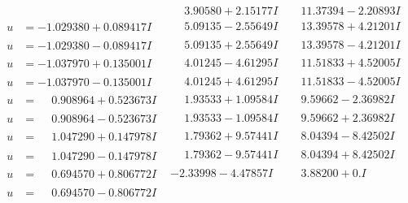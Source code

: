 \documentclass[1p]{elsarticle_modified}
\theoremstyle{definition}
\begin{document}
$$\begin{array}{c|c|c}
 & \phantom{-}3.90580 + 2.15177 I & \phantom{-}11.37394 - 2.20893 I \\ \hline\begin{aligned}
u &= -1.029380 + 0.089417 I\end{aligned}
 & \phantom{-}5.09135 - 2.55649 I & \phantom{-}13.39578 + 4.21201 I \\ \hline\begin{aligned}
u &= -1.029380 - 0.089417 I\end{aligned}
 & \phantom{-}5.09135 + 2.55649 I & \phantom{-}13.39578 - 4.21201 I \\ \hline\begin{aligned}
u &= -1.037970 + 0.135001 I\end{aligned}
 & \phantom{-}4.01245 - 4.61295 I & \phantom{-}11.51833 + 4.52005 I \\ \hline\begin{aligned}
u &= -1.037970 - 0.135001 I\end{aligned}
 & \phantom{-}4.01245 + 4.61295 I & \phantom{-}11.51833 - 4.52005 I \\ \hline\begin{aligned}
u &= \phantom{-}0.908964 + 0.523673 I\end{aligned}
 & \phantom{-}1.93533 + 1.09584 I & \phantom{-}9.59662 - 2.36982 I \\ \hline\begin{aligned}
u &= \phantom{-}0.908964 - 0.523673 I\end{aligned}
 & \phantom{-}1.93533 - 1.09584 I & \phantom{-}9.59662 + 2.36982 I \\ \hline\begin{aligned}
u &= \phantom{-}1.047290 + 0.147978 I\end{aligned}
 & \phantom{-}1.79362 + 9.57441 I & \phantom{-}8.04394 - 8.42502 I \\ \hline\begin{aligned}
u &= \phantom{-}1.047290 - 0.147978 I\end{aligned}
 & \phantom{-}1.79362 - 9.57441 I & \phantom{-}8.04394 + 8.42502 I \\ \hline\begin{aligned}
u &= \phantom{-}0.694570 + 0.806772 I\end{aligned}
 & -2.33998 - 4.47857 I & \phantom{-}3.88200 + 0. I\phantom{ +0.000000I} \\ \hline\begin{aligned}
u &= \phantom{-}0.694570 - 0.806772 I\end{aligned}

\end{array}$$
\end{document}
